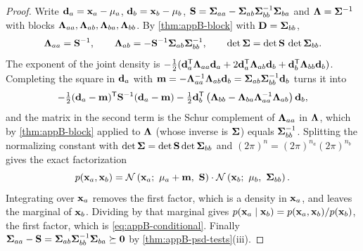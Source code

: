 \begin{proof}
Write $\mathbf{d}_a = \mathbf{x}_a - \mathbf{\mu}_a$, $\mathbf{d}_b = \mathbf{x}_b - \mathbf{\mu}_b$, $\mathbf{S} = \mathbf{\Sigma}_{aa} - \mathbf{\Sigma}_{ab}\mathbf{\Sigma}_{bb}^{-1}\mathbf{\Sigma}_{ba}$ and $\mathbf{\Lambda} = \mathbf{\Sigma}^{-1}$ with blocks $\mathbf{\Lambda}_{aa}, \mathbf{\Lambda}_{ab}, \mathbf{\Lambda}_{ba}, \mathbf{\Lambda}_{bb}$. By \cref{thm:appB-block} with $\mathbf{D} = \mathbf{\Sigma}_{bb}$,
\begin{equation*}
  \mathbf{\Lambda}_{aa} = \mathbf{S}^{-1},\qquad
  \mathbf{\Lambda}_{ab} = -\mathbf{S}^{-1}\mathbf{\Sigma}_{ab}\mathbf{\Sigma}_{bb}^{-1},\qquad
  \det\mathbf{\Sigma} = \det\mathbf{S}\,\det\mathbf{\Sigma}_{bb} .
\end{equation*}
The exponent of the joint density is $-\tfrac12(\mathbf{d}_a^{\mathsf{T}}\mathbf{\Lambda}_{aa}\mathbf{d}_a + 2\mathbf{d}_a^{\mathsf{T}}\mathbf{\Lambda}_{ab}\mathbf{d}_b + \mathbf{d}_b^{\mathsf{T}}\mathbf{\Lambda}_{bb}\mathbf{d}_b)$. Completing the square in $\mathbf{d}_a$ with $\mathbf{m} = -\mathbf{\Lambda}_{aa}^{-1}\mathbf{\Lambda}_{ab}\mathbf{d}_b = \mathbf{\Sigma}_{ab}\mathbf{\Sigma}_{bb}^{-1}\mathbf{d}_b$ turns it into
\begin{equation*}
  -\tfrac12(\mathbf{d}_a - \mathbf{m})^{\mathsf{T}}\mathbf{S}^{-1}(\mathbf{d}_a - \mathbf{m})
  -\tfrac12\mathbf{d}_b^{\mathsf{T}}\left(\mathbf{\Lambda}_{bb} - \mathbf{\Lambda}_{ba}\mathbf{\Lambda}_{aa}^{-1}\mathbf{\Lambda}_{ab}\right)\mathbf{d}_b ,
\end{equation*}
and the matrix in the second term is the Schur complement of $\mathbf{\Lambda}_{aa}$ in $\mathbf{\Lambda}$, which by \cref{thm:appB-block} applied to $\mathbf{\Lambda}$ (whose inverse is $\mathbf{\Sigma}$) equals $\mathbf{\Sigma}_{bb}^{-1}$. Splitting the normalizing constant with $\det\mathbf{\Sigma} = \det\mathbf{S}\det\mathbf{\Sigma}_{bb}$ and $(2\pi)^{n} = (2\pi)^{n_a}(2\pi)^{n_b}$ gives the exact factorization
\begin{equation}
  p(\state_a, \state_b) = \Normal\left(\state_a;\ \vect{\mu}_a + \vect{m},\ \mat{S}\right)\cdot \Normal\left(\state_b;\ \vect{\mu}_b,\ \mat{\Sigma}_{bb}\right).
  \label{eq:appB-factorisation}
\end{equation}
Integrating over $\mathbf{x}_a$ removes the first factor, which is a density in $\mathbf{x}_a$, and leaves the marginal of $\mathbf{x}_b$. Dividing by that marginal gives $p(\mathbf{x}_a \mid \mathbf{x}_b) = p(\mathbf{x}_a, \mathbf{x}_b)/p(\mathbf{x}_b)$, the first factor, which is \cref{eq:appB-conditional}. Finally $\mathbf{\Sigma}_{aa} - \mathbf{S} = \mathbf{\Sigma}_{ab}\mathbf{\Sigma}_{bb}^{-1}\mathbf{\Sigma}_{ba} \succeq \mathbf{0}$ by \cref{thm:appB-psd-tests}(iii). \qedhere
\end{proof}

